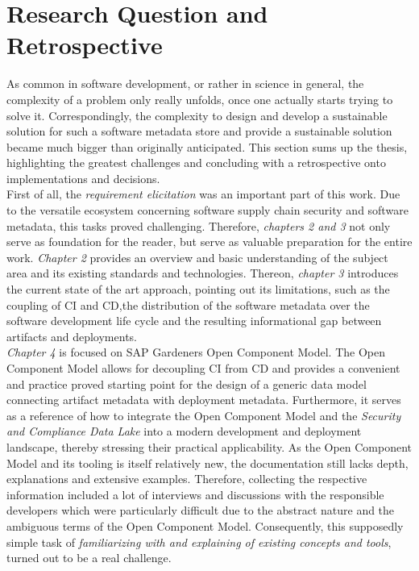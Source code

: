 \section{Research Question and Retrospective}
As common in software development, or rather in science in general, the complexity of a problem only really unfolds, once one actually starts trying to solve it. Correspondingly, the complexity to design and develop a sustainable solution for such a software metadata store and provide a sustainable solution became much bigger than originally anticipated. This section sums up the thesis, highlighting the greatest challenges and concluding with a retrospective onto implementations and decisions.\\

First of all, the \emph{requirement elicitation} was an important part of this work. Due to the versatile ecosystem concerning software supply chain security and software metadata, this tasks proved challenging. Therefore, \emph{chapters 2 and 3} not only serve as foundation for the reader, but serve as valuable preparation for the entire work. \emph{Chapter 2} provides an overview and basic understanding of the subject area and its existing standards and technologies. Thereon, \emph{chapter 3} introduces the current state of the art approach, pointing out its limitations, such as the coupling of CI and CD,the distribution of the software metadata over the software development life cycle and the resulting informational gap between artifacts and deployments.\\
\emph{Chapter 4} is focused on SAP Gardeners Open Component Model. The Open Component Model allows for decoupling CI from CD and provides a convenient and practice proved starting point for the design of a generic data model connecting artifact metadata with deployment metadata. Furthermore, it serves as a reference of how to integrate the Open Component Model and the \emph{Security and Compliance Data Lake} into a modern development and deployment landscape, thereby stressing their practical applicability. As the Open Component Model and its tooling is itself relatively new, the documentation still lacks depth, explanations and extensive examples. Therefore, collecting the respective information included a lot of interviews and discussions with the responsible developers which were particularly difficult due to the abstract nature and the ambiguous terms of the Open Component Model. Consequently, this supposedly simple task of \emph{familiarizing with and explaining of existing concepts and tools}, turned out to be a real challenge.\\

